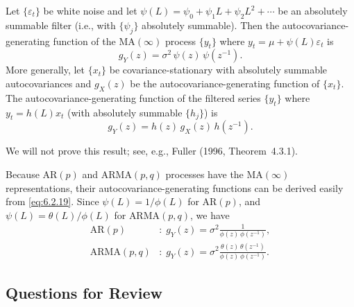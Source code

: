 \begin{proposition}
\label{prop:6.6}
Let $\{\varepsilon_t\}$ be white noise and let $\psi(L) = \psi_0 + \psi_1 L + \psi_2 L^2 + \cdots$ be an absolutely
summable filter (i.e., with $\{\psi_j\}$ absolutely summable). Then the autocovariance-generating
function of the $\mathrm{MA}(\infty)$ process $\{y_t\}$ where $y_t = \mu + \psi(L) \varepsilon_t$ is
\begin{equation}
  g_Y(z) = \sigma^2\,\psi(z)\,\psi(z^{-1}).
  \label{eq:6.2.19}
\end{equation}
More generally, let $\{x_t\}$ be covariance-stationary with absolutely summable
autocovariances and $g_X(z)$ be the autocovariance-generating function of $\{x_t\}$. The
autocovariance-generating function of the filtered series $\{y_t\}$ where $y_t = h(L) x_t$
(with absolutely summable $\{h_j\}$) is
\begin{equation}
  g_Y(z) = h(z)\,g_X(z)\,h(z^{-1}).
  \label{eq:6.2.20}
\end{equation}
\end{proposition}

We will not prove this result; see, e.g., Fuller (1996, Theorem~4.3.1).

Because $\text{AR}(p)$ and $\text{ARMA}(p, q)$ processes have the $\text{MA}(\infty)$ representations,
their autocovariance-generating functions can be derived easily from \eqref{eq:6.2.19}.
Since $\psi(L) = 1/\phi(L)$ for $\text{AR}(p)$, and $\psi(L) = \theta(L)/\phi(L)$ for $\text{ARMA}(p, q)$, we
have
\begin{align}
  \text{AR}(p) &: \; g_Y(z) = \sigma^2 \frac{1}{\phi(z)\,\phi(z^{-1})},
  \label{eq:6.2.21} \\
  \text{ARMA}(p, q) &: \; g_Y(z) = \sigma^2 \frac{\theta(z)\,\theta(z^{-1})}{\phi(z)\,\phi(z^{-1})}.
  \label{eq:6.2.22}
\end{align}

\subsection*{Questions for Review}


